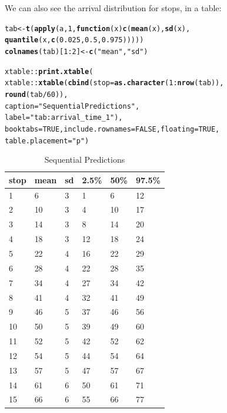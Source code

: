 \documentclass[11pt]{article}\usepackage[]{graphicx}\usepackage[]{color}
\makeatletter
\newcommand{\hlnum}[1]{\textcolor[rgb]{0.686,0.059,0.569}{#1}}%
\newcommand{\hlstr}[1]{\textcolor[rgb]{0.192,0.494,0.8}{#1}}%
\newcommand{\hlopt}[1]{\textcolor[rgb]{0,0,0}{#1}}%
\newcommand{\hlstd}[1]{\textcolor[rgb]{0.345,0.345,0.345}{#1}}%
\newcommand{\hlkwa}[1]{\textcolor[rgb]{0.161,0.373,0.58}{\textbf{#1}}}%
\newcommand{\hlkwb}[1]{\textcolor[rgb]{0.69,0.353,0.396}{#1}}%
\newcommand{\hlkwc}[1]{\textcolor[rgb]{0.333,0.667,0.333}{#1}}%
\newcommand{\hlkwd}[1]{\textcolor[rgb]{0.737,0.353,0.396}{\textbf{#1}}}%
\newenvironment{kframe}{%
 \def\at@end@of@kframe{}%
 \ifinner\ifhmode%
  \def\at@end@of@kframe{\end{minipage}}%
  \begin{minipage}{\columnwidth}%
 \fi\fi%
 \def\FrameCommand##1{\hskip\@totalleftmargin \hskip-\fboxsep
 \colorbox{shadecolor}{##1}\hskip-\fboxsep
     \hskip-\linewidth \hskip-\@totalleftmargin \hskip\columnwidth}%
 \MakeFramed {\advance\hsize-\width
   \@totalleftmargin\z@ \linewidth\hsize
   \@setminipage}}%
 {\par\unskip\endMakeFramed%
 \at@end@of@kframe}
\makeatother
\begin{document}
We can also see the arrival distribution for stops, in a table:
\begin{kframe}
\begin{alltt}
\hlstd{tab} \hlkwb{<-} \hlkwd{t}\hlstd{(}\hlkwd{apply}\hlstd{(a,} \hlnum{1}\hlstd{,} \hlkwa{function}\hlstd{(}\hlkwc{x}\hlstd{)} \hlkwd{c}\hlstd{(}\hlkwd{mean}\hlstd{(x),} \hlkwd{sd}\hlstd{(x),}
                                   \hlkwd{quantile}\hlstd{(x,} \hlkwd{c}\hlstd{(}\hlnum{0.025}\hlstd{,} \hlnum{0.5}\hlstd{,} \hlnum{0.975}\hlstd{)))))}
\hlkwd{colnames}\hlstd{(tab)[}\hlnum{1}\hlopt{:}\hlnum{2}\hlstd{]} \hlkwb{<-} \hlkwd{c}\hlstd{(}\hlstr{"mean"}\hlstd{,} \hlstr{"sd"}\hlstd{)}

\hlstd{xtable}\hlopt{::}\hlkwd{print.xtable}\hlstd{(}
    \hlstd{xtable}\hlopt{::}\hlkwd{xtable}\hlstd{(}\hlkwd{cbind}\hlstd{(}\hlkwc{stop} \hlstd{=} \hlkwd{as.character}\hlstd{(}\hlnum{1}\hlopt{:}\hlkwd{nrow}\hlstd{(tab)),}
                         \hlkwd{round}\hlstd{(tab} \hlopt{/} \hlnum{60}\hlstd{)),}
                   \hlkwc{caption} \hlstd{=} \hlstr{"Sequential Predictions"}\hlstd{,}
                   \hlkwc{label} \hlstd{=} \hlstr{"tab:arrival_time_1"}\hlstd{),}
    \hlkwc{booktabs} \hlstd{=} \hlnum{TRUE}\hlstd{,} \hlkwc{include.rownames} \hlstd{=} \hlnum{FALSE}\hlstd{,} \hlkwc{floating} \hlstd{=} \hlnum{TRUE}\hlstd{,}
    \hlkwc{table.placement} \hlstd{=} \hlstr{"p"}\hlstd{)}
\end{alltt}
\end{kframe}%
\begin{table}[p]
\centering
\begin{tabular}{llllll}
  \toprule
stop & mean & sd & 2.5\% & 50\% & 97.5\% \\ 
  \midrule
1 & 6 & 3 & 1 & 6 & 12 \\ 
  2 & 10 & 3 & 4 & 10 & 17 \\ 
  3 & 14 & 3 & 8 & 14 & 20 \\ 
  4 & 18 & 3 & 12 & 18 & 24 \\ 
  5 & 22 & 4 & 16 & 22 & 29 \\ 
  6 & 28 & 4 & 22 & 28 & 35 \\ 
  7 & 34 & 4 & 27 & 34 & 42 \\ 
  8 & 41 & 4 & 32 & 41 & 49 \\ 
  9 & 46 & 5 & 37 & 46 & 56 \\ 
  10 & 50 & 5 & 39 & 49 & 60 \\ 
  11 & 52 & 5 & 42 & 52 & 62 \\ 
  12 & 54 & 5 & 44 & 54 & 64 \\ 
  13 & 57 & 5 & 47 & 57 & 67 \\ 
  14 & 61 & 6 & 50 & 61 & 71 \\ 
  15 & 66 & 6 & 55 & 66 & 77 \\ 
   \bottomrule
\end{tabular}
\caption{Sequential Predictions} 
\label{tab:arrival_time_1}
\end{table}
\end{document}
